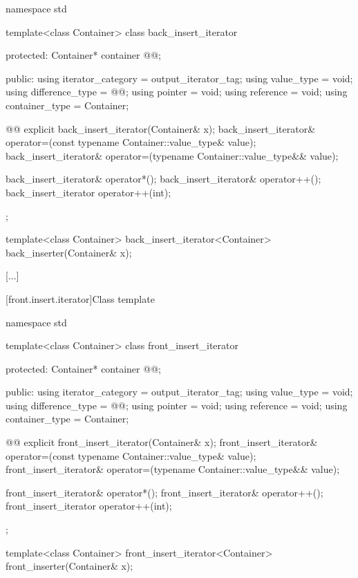 %
\begin{codeblock}
namespace std {
  template<class Container>
  class back_insert_iterator {
  protected:
    Container* container @@;

  public:
    using iterator_category = output_iterator_tag;
    using value_type        = void;
    using difference_type   = @@;
    using pointer           = void;
    using reference         = void;
    using container_type    = Container;

    @@
    explicit back_insert_iterator(Container& x);
    back_insert_iterator& operator=(const typename Container::value_type& value);
    back_insert_iterator& operator=(typename Container::value_type&& value);

    back_insert_iterator& operator*();
    back_insert_iterator& operator++();
    back_insert_iterator  operator++(int);
  };

  template<class Container>
    back_insert_iterator<Container> back_inserter(Container& x);
}
\end{codeblock}

[...]

[front.insert.iterator]{Class template }


%
\begin{codeblock}
namespace std {
  template<class Container>
  class front_insert_iterator {
  protected:
    Container* container @@;

  public:
    using iterator_category = output_iterator_tag;
    using value_type        = void;
    using difference_type   = @@;
    using pointer           = void;
    using reference         = void;
    using container_type    = Container;

    @@
    explicit front_insert_iterator(Container& x);
    front_insert_iterator& operator=(const typename Container::value_type& value);
    front_insert_iterator& operator=(typename Container::value_type&& value);

    front_insert_iterator& operator*();
    front_insert_iterator& operator++();
    front_insert_iterator  operator++(int);
  };

  template<class Container>
    front_insert_iterator<Container> front_inserter(Container& x);
}
\end{codeblock}

